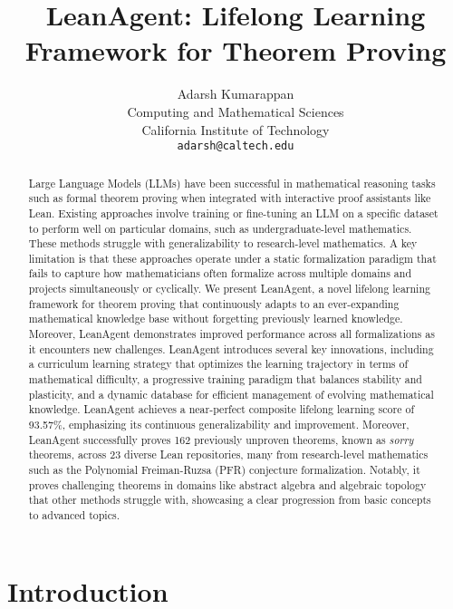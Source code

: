 \documentclass{article} %
\title{LeanAgent: Lifelong Learning Framework for Theorem Proving}
\author{
  Adarsh Kumarappan \\
  Computing and Mathematical Sciences\\
  California Institute of Technology\\
  \texttt{adarsh@caltech.edu} \\
}
\begin{document}
\maketitle

\begin{abstract}
Large Language Models (LLMs) have been successful in mathematical reasoning tasks such as formal theorem proving when integrated with interactive proof assistants like Lean. Existing approaches involve training or fine-tuning an LLM on a specific dataset to perform well on particular domains, such as undergraduate-level mathematics. These methods struggle with generalizability to research-level mathematics. A key limitation is that these approaches operate under a static formalization paradigm that fails to capture how mathematicians often formalize across multiple domains and projects simultaneously or cyclically. We present LeanAgent, a novel lifelong learning framework for theorem proving that continuously adapts to an ever-expanding mathematical knowledge base without forgetting previously learned knowledge. Moreover, LeanAgent demonstrates improved performance across all formalizations as it encounters new challenges. LeanAgent introduces several key innovations, including a curriculum learning strategy that optimizes the learning trajectory in terms of mathematical difficulty, a progressive training paradigm that balances stability and plasticity, and a dynamic database for efficient management of evolving mathematical knowledge. LeanAgent achieves a near-perfect composite lifelong learning score of 93.57\%, emphasizing its continuous generalizability and improvement. Moreover, LeanAgent successfully proves 162 previously unproven theorems, known as \textit{sorry} theorems, across 23 diverse Lean repositories, many from research-level mathematics such as the Polynomial Freiman-Ruzsa (PFR) conjecture formalization. Notably, it proves challenging theorems in domains like abstract algebra and algebraic topology that other methods struggle with, showcasing a clear progression from basic concepts to advanced topics.
\end{abstract}

\section{Introduction}
\end{document}
